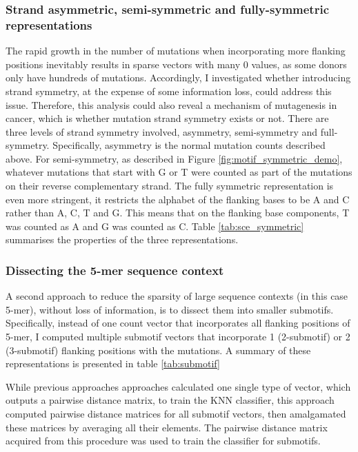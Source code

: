 \subsubsection{Strand asymmetric, semi-symmetric and fully-symmetric representations}
The rapid growth in the number of mutations when incorporating more flanking positions inevitably results in sparse vectors with many 0 values, as some donors only have hundreds of mutations. Accordingly, I investigated whether introducing strand symmetry, at the expense of some information loss, could address this issue. Therefore, this analysis could also reveal a mechanism of mutagenesis in cancer, which is whether mutation strand symmetry exists or not. There are three levels of strand symmetry involved, asymmetry, semi-symmetry and full-symmetry. Specifically, asymmetry is the normal mutation counts described above. For semi-symmetry, as described in Figure \ref{fig:motif_symmetric_demo}, whatever mutations that start with G or T were counted as part of the mutations on their reverse complementary strand. The fully symmetric representation is even more stringent, it restricts the alphabet of the flanking bases to be A and C rather than A, C, T and G. This means that on the flanking base components, T was counted as A and G was counted as C. Table \ref{tab:sce_symmetric} summarises the properties of the three representations.



\subsubsection{Dissecting the 5-mer sequence context}
A second approach to reduce the sparsity of large sequence contexts (in this case 5-mer), without loss of information, is to dissect them into smaller submotifs. Specifically, instead of one count vector that incorporates all flanking positions of 5-mer, I computed multiple submotif vectors that incorporate 1 (2-submotif) or 2 (3-submotif) flanking positions with the mutations. A summary of these representations is presented in table \ref{tab:submotif}



While previous approaches approaches calculated one single type of vector, which outputs a pairwise distance matrix, to train the KNN classifier, this approach computed pairwise distance matrices for all submotif vectors, then amalgamated these matrices by averaging all their elements. The pairwise distance matrix acquired from this procedure was used to train the classifier for submotifs. 

